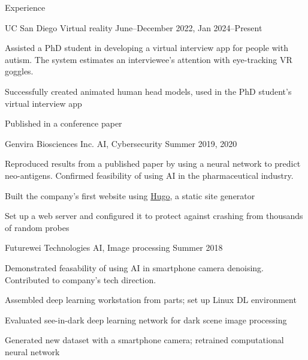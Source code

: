 	\begin{rSection}{Experience}

		\begin{rSubsection}{UC San Diego} {Virtual reality} {June--December 2022, Jan 2024--Present} %
			\item Assisted a PhD student in developing a virtual interview app for people with autism. The system estimates an interviewee's attention with eye-tracking VR goggles.
			\item Successfully created animated human head models, used in the PhD student's virtual interview app
			\item Published in a conference paper
		\end{rSubsection}

		\begin{rSubsection}{Genvira Biosciences Inc.} {AI, Cybersecurity} {Summer 2019, 2020}
			\item Reproduced results from a published paper by using a neural network to predict neo-antigens. Confirmed feasibility of using AI in the pharmaceutical industry.
			\item Built the company's first website using \href{https://gohugo.io/}{Hugo}, a static site generator
			\item Set up a web server and configured it to protect against crashing from thousands of random probes
		\end{rSubsection}

		\begin{rSubsection}{Futurewei Technologies} {AI, Image processing} {Summer 2018}
			\item Demonstrated feasability of using AI in smartphone camera denoising. Contributed to company's tech direction.
			\item Assembled deep learning workstation from parts; set up Linux DL environment
			\item Evaluated see-in-dark deep learning network for dark scene image processing
			\item Generated new dataset with a smartphone camera; retrained computational neural network
		\end{rSubsection}

	\end{rSection}

